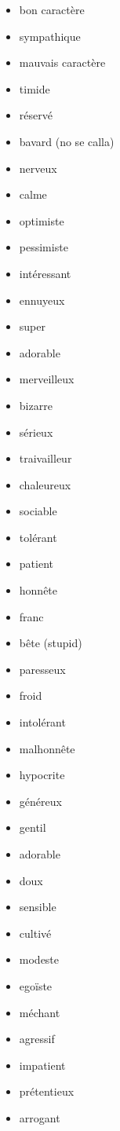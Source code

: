 \documentclass[palatino]{nicenotes}
\begin{document}
\begin{multicols}{3}
\begin{itemize}
\item bon caractère
\item sympathique
\item mauvais caractère
\item timide
\item réservé
\item bavard (no se calla)
\item nerveux
\item calme
\item optimiste
\item pessimiste
\item intéressant
\item ennuyeux
\item super
\item adorable
\item merveilleux
\item bizarre
\item sérieux
\item traivailleur
\item chaleureux
\item sociable
\item tolérant
\item patient
\item honn\^ete
\item franc
\item b\^ete (stupid)
\item paresseux
\item froid
\item intolérant
\item malhonn\^ete
\item hypocrite
\item généreux
\item gentil
\item adorable
\item doux
\item sensible
\item cultivé
\item modeste
\item egoïste
\item méchant
\item agressif
\item impatient
\item prétentieux
\item arrogant
\end{itemize}
\end{multicols}
\end{document}
